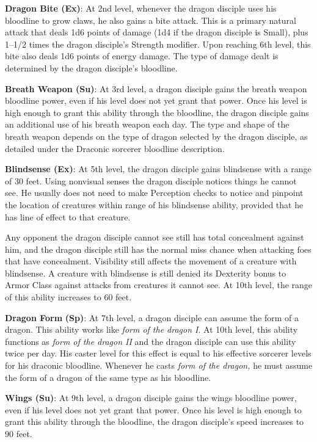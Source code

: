 \textbf{Dragon Bite (Ex)}: At 2nd level, whenever the dragon disciple uses his bloodline to grow claws, he also gains a bite attack. This is a primary natural attack that deals 1d6 points of damage (1d4 if the dragon disciple is Small), plus 1--1/2 times the dragon disciple's Strength modifier. Upon reaching 6th level, this bite also deals 1d6 points of energy damage. The type of damage dealt is determined by the dragon disciple's bloodline.
				
\textbf{Breath Weapon (Su)}: At 3rd level, a dragon disciple gains the breath weapon bloodline power, even if his level does not yet grant that power. Once his level is high enough to grant this ability through the bloodline, the dragon disciple gains an additional use of his breath weapon each day. The type and shape of the breath weapon depends on the type of dragon selected by the dragon disciple, as detailed under the Draconic sorcerer bloodline description. 
				
\textbf{Blindsense (Ex)}: At 5th level, the dragon disciple gains blindsense with a range of 30 feet. Using nonvisual senses the dragon disciple notices things he cannot see. He usually does not need to make Perception checks to notice and pinpoint the location of creatures within range of his blindsense ability, provided that he has line of effect to that creature.
				
Any opponent the dragon disciple cannot see still has total concealment against him, and the dragon disciple still has the normal miss chance when attacking foes that have concealment. Visibility still affects the movement of a creature with blindsense. A creature with blindsense is still denied its Dexterity bonus to Armor Class against attacks from creatures it cannot see. At 10th level, the range of this ability increases to 60 feet.
				
\textbf{Dragon Form} \textbf{(Sp)}: At 7th level, a dragon disciple can assume the form of a dragon. This ability works like \textit{form of the dragon I}. At 10th level, this ability functions as \textit{form of the dragon II} and the dragon disciple can use this ability twice per day. His caster level for this effect is equal to his effective sorcerer levels for his draconic bloodline. Whenever he casts \textit{form of the dragon,} he must assume the form of a dragon of the same type as his bloodline.
				
\textbf{Wings (Su)}: At 9th level, a dragon disciple gains the wings bloodline power, even if his level does not yet grant that power. Once his level is high enough to grant this ability through the bloodline, the dragon disciple's speed increases to 90 feet.
        	
